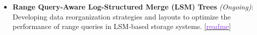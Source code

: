 \documentclass[10pt,a4paper,calibri]{moderncv}
\begin{document}
\begin{itemize}\setlength\itemsep{0.4em}
	\item \textbf{Range Query-Aware Log-Structured Merge (LSM) Trees} \textit{(Ongoing)}: Developing data reorganization strategies and layouts to optimize the performance of range queries in LSM-based storage systems.
	      \href{https://github.com/shubham-sudo/LSMQueryDrivenCompaction}{[\textcolor{blueviolet}{readme}]}



\end{itemize}
\end{document}
